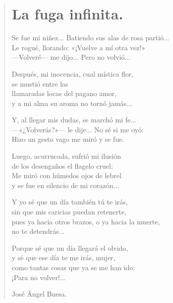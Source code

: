 \documentclass[11pt, portrait, twoside, notitlepage, openright]{book}
\begin{document}
\newpage
\begin{verse}
\begin{center}
\section{La fuga infinita.}
\end{center}
Se fue mi niñez...
Batiendo sus alas de rosa partió...\\
Le rogué, llorando: «¡Vuelve a mí otra vez!»\\
—Volveré— me dijo... Pero no volvió...
\newline

Después, mi inocencia, cual mística flor,\\
se mustió entre las\\
llamaradas locas del pagano amor,\\
y a mi alma su aroma no tornó jamás...
\newline

Y, al llegar mis dudas, se marchó mi fe...\\
—«¿Volverás?»— le dije... No sé si me oyó:\\
Hizo un gesto vago me miró y se fue.
\newline

Luego, acurrucada, sufrió mi ilusión\\
de los desengaños el flagelo cruel:\\
Me miró con húmedos ojos de lebrel\\
y se fue en silencio de mi corazón...
\newline

Y yo sé que un día también tú te irás,\\
sin que mis caricias puedan retenerte,\\
pues ya hacia otros brazos, o ya hacia la muerte,\\
no te detendrás...
\newpage

Porque sé que un día llegará el olvido,\\
y sé que ese día te me irás, mujer,\\
como tantas cosas que ya se me han ido:\\
¡Para no volver!...
\newline

José Ángel Buesa.
\end{verse}
\end{document}
